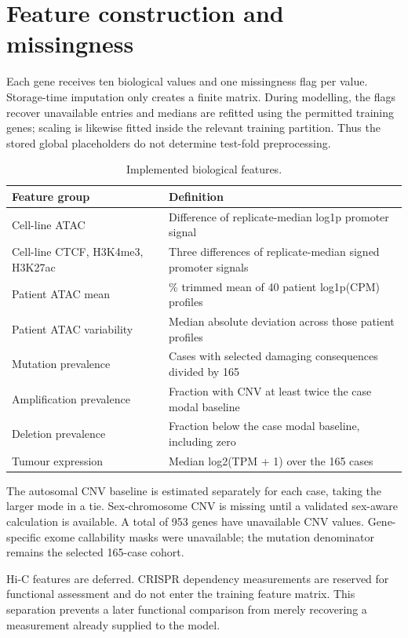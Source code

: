 \documentclass[12pt,a4paper,oneside]{report}
\begin{document}
\section{Feature construction and missingness}
Each gene receives ten biological values and one missingness flag per value. Storage-time imputation only creates a finite matrix. During modelling, the flags recover unavailable entries and medians are refitted using the permitted training genes; scaling is likewise fitted inside the relevant training partition. Thus the stored global placeholders do not determine test-fold preprocessing.

\begin{table}[H]\centering
\caption{Implemented biological features.}
{\small
\begin{tabularx}{\textwidth}{@{}>{\raggedright\arraybackslash}X>{\raggedright\arraybackslash}X@{}}\toprule
\textbf{Feature group} & \textbf{Definition}\\\midrule
Cell-line ATAC & Difference of replicate-median log1p promoter signal\\
Cell-line CTCF, H3K4me3, H3K27ac & Three differences of replicate-median signed promoter signals\\
Patient ATAC mean & 10\% trimmed mean of 40 patient log1p(CPM) profiles\\
Patient ATAC variability & Median absolute deviation across those patient profiles\\
Mutation prevalence & Cases with selected damaging consequences divided by 165\\
Amplification prevalence & Fraction with CNV at least twice the case modal baseline\\
Deletion prevalence & Fraction below the case modal baseline, including zero\\
Tumour expression & Median log2(TPM + 1) over the 165 cases\\
\bottomrule\end{tabularx}}
\end{table}
The autosomal CNV baseline is estimated separately for each case, taking the larger mode in a tie. Sex-chromosome CNV is missing until a validated sex-aware calculation is available. A total of 953 genes have unavailable CNV values. Gene-specific exome callability masks were unavailable; the mutation denominator remains the selected 165-case cohort.

Hi-C features are deferred. CRISPR dependency measurements are reserved for functional assessment and do not enter the training feature matrix. This separation prevents a later functional comparison from merely recovering a measurement already supplied to the model.
\end{document}
